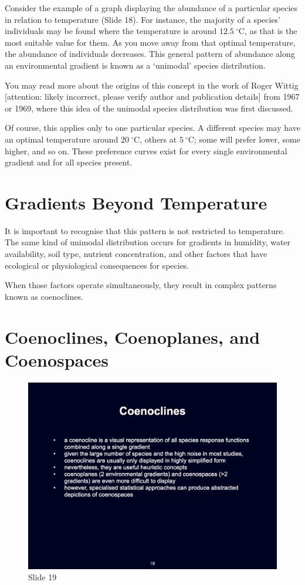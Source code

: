\documentclass[
  11pt,
]{book}
\begin{document}
Consider the example of a graph displaying the abundance of a particular
species in relation to temperature (Slide 18). For instance, the
majority of a species' individuals may be found where the temperature is
around \(12.5~^\circ\text{C}\), as that is the most suitable value for
them. As you move away from that optimal temperature, the abundance of
individuals decreases. This general pattern of abundance along an
environmental gradient is known as a `unimodal' species distribution.

You may read more about the origins of this concept in the work of Roger
Wittig {[}attention: likely incorrect, please verify author and
publication details{]} from 1967 or 1969, where this idea of the
unimodal species distribution was first discussed.

Of course, this applies only to one particular species. A different
species may have an optimal temperature around \(20~^\circ\text{C}\),
others at \(5~^\circ\text{C}\); some will prefer lower, some higher, and
so on. These preference curves exist for every single environmental
gradient and for all species present.

\section{Gradients Beyond
Temperature}\label{gradients-beyond-temperature}

It is important to recognise that this pattern is not restricted to
temperature. The same kind of unimodal distribution occurs for gradients
in humidity, water availability, soil type, nutrient concentration, and
other factors that have ecological or physiological consequences for
species.

When those factors operate simultaneously, they result in complex
patterns known as coenoclines.

\section{Coenoclines, Coenoplanes, and
Coenospaces}\label{coenoclines-coenoplanes-and-coenospaces}

\begin{figure}[ht]
\centering
\includegraphics[width=0.8\linewidth]{../images/BDC334/BDC334-019.jpeg}
\caption*{Slide 19}
\end{figure}
\end{document}
